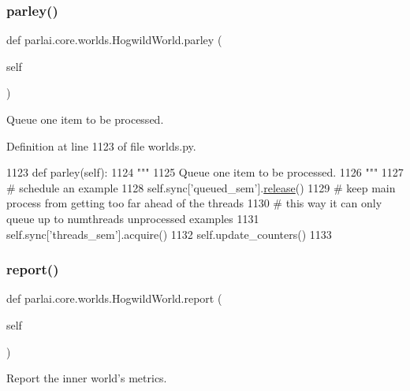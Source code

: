 \subsubsection{\texorpdfstring{parley()}{parley()}}
{\footnotesize\ttfamily def parlai.\+core.\+worlds.\+Hogwild\+World.\+parley (\begin{DoxyParamCaption}\item[{}]{self }\end{DoxyParamCaption})}

\begin{DoxyVerb}Queue one item to be processed.
\end{DoxyVerb}
 

Definition at line 1123 of file worlds.\+py.


\begin{DoxyCode}
1123     \textcolor{keyword}{def }parley(self):
1124         \textcolor{stringliteral}{"""}
1125 \textcolor{stringliteral}{        Queue one item to be processed.}
1126 \textcolor{stringliteral}{        """}
1127         \textcolor{comment}{# schedule an example}
1128         self.sync[\textcolor{stringliteral}{'queued\_sem'}].\hyperlink{namespaceconf_a325dc746d8bf05c54d26351c35a21d90}{release}()
1129         \textcolor{comment}{# keep main process from getting too far ahead of the threads}
1130         \textcolor{comment}{# this way it can only queue up to numthreads unprocessed examples}
1131         self.sync[\textcolor{stringliteral}{'threads\_sem'}].acquire()
1132         self.update\_counters()
1133 
\end{DoxyCode}
\mbox{\label{classparlai_1_1core_1_1worlds_1_1HogwildWorld_a11c6831feb2a54a0d9513b4a514d4097}} 
\subsubsection{\texorpdfstring{report()}{report()}}
{\footnotesize\ttfamily def parlai.\+core.\+worlds.\+Hogwild\+World.\+report (\begin{DoxyParamCaption}\item[{}]{self }\end{DoxyParamCaption})}

\begin{DoxyVerb}Report the inner world's metrics.
\end{DoxyVerb}
 

